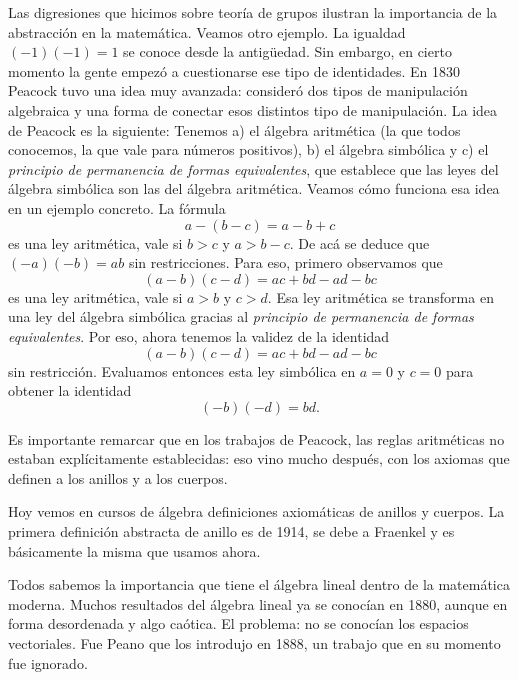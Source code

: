 Las digresiones que hicimos sobre teoría de grupos ilustran la importancia de la abstracción en la matemática. Veamos otro ejemplo. La igualdad $(-1)(-1)=1$ se conoce
desde la antigüedad. Sin embargo, en cierto momento la gente empezó a cuestionarse
ese tipo de identidades. En 1830 Peacock tuvo una idea muy avanzada: consideró dos tipos de manipulación algebraica y una forma de conectar esos distintos tipo de manipulación. La idea de Peacock es la siguiente: Tenemos a) el álgebra aritmética (la que todos conocemos, la que vale para números positivos), b) el álgebra simbólica y c) el \emph{principio de permanencia de formas equivalentes}, que establece que las leyes del álgebra simbólica son las del álgebra aritmética.  Veamos cómo funciona esa idea en un ejemplo concreto. La fórmula
\[
a-(b-c)=a-b+c
\]
es una ley aritmética, vale si $b>c$ y $a>b-c$. De acá se deduce que
$(-a)(-b)=ab$ sin restricciones. Para eso, 
primero observamos que 
\[
(a-b)(c-d)=ac+bd-ad-bc
\]
es una ley aritmética, vale si $a>b$ y $c>d$. Esa ley aritmética
se transforma en una ley del álgebra simbólica gracias al 
\emph{principio de permanencia de formas equivalentes}. Por eso, 
ahora tenemos la validez de la identidad 
\[
(a-b)(c-d)=ac+bd-ad-bc
\]
sin restricción. Evaluamos entonces esta ley simbólica en $a=0$ y $c=0$ 
para obtener la identidad
\[
(-b)(-d)=bd.
\]

Es importante remarcar que en los trabajos de Peacock, las reglas aritméticas
no estaban explícitamente establecidas: eso vino mucho después, con los axiomas
que definen a los anillos y a los cuerpos.  

Hoy vemos en cursos de álgebra definiciones axiomáticas de anillos
y cuerpos. La primera definición abstracta de anillo 
es de 1914, se debe a Fraenkel y es básicamente la misma que usamos
ahora. 

Todos sabemos la importancia que tiene el álgebra lineal 
dentro de la matemática moderna. Muchos resultados del álgebra
lineal ya se conocían en 1880, aunque en forma desordenada y algo caótica. 
El problema: no se conocían los espacios vectoriales. Fue Peano
que los introdujo en 1888, un trabajo que en su momento 
fue ignorado. 

